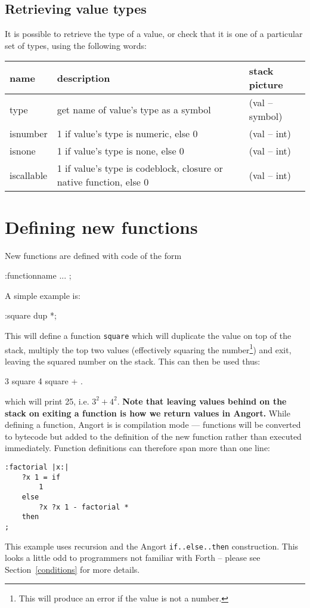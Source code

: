 \subsection{Retrieving value types}
\label{typechecking}
It is possible to retrieve the type of a value, or check that it is
one of a particular set of types, using the following words:
\begin{center}
\begin{tabular}{|l|p{4in}|l|}\hline
\textbf{name} & \textbf{description} & \textbf{stack picture}\\ \hline
type & get name of value's type as a symbol & (val -- symbol)\\
isnumber & 1 if value's type is numeric, else 0 & (val -- int)\\
isnone & 1 if value's type is none, else 0 & (val -- int)\\
iscallable & 1 if value's type is codeblock, closure or native function, else 0 & (val -- int)\\
\hline
\end{tabular}
\end{center}

\clearpage
\section{Defining new functions}
New functions are defined with code of the form
\begin{v}
:functionname ... ;
\end{v}
A simple example is:
\begin{v}
:square dup *;
\end{v}
This will define a function \texttt{square} which will duplicate
the value on top of the stack, multiply the top two values
(effectively squaring the number\footnote{This will produce
an error if the value is not a number.}) and exit, leaving the
squared number on the stack. This can then be used thus:
\begin{v}
3 square 4 square + .
\end{v}
which will print 25, i.e. $3^2+4^2$. \textbf{Note that leaving values behind
on the stack on exiting a function is how we return values in Angort.}
While defining a function, Angort is is compilation mode --- functions will
be converted to bytecode but added to the definition of the new function
rather than executed immediately. Function definitions can therefore span
more than one line:
\begin{lstlisting}
:factorial |x:|
    ?x 1 = if
        1
    else
        ?x ?x 1 - factorial *
    then
;  
\end{lstlisting}
This example uses recursion and the Angort \texttt{if..else..then} construction.
This looks a little odd to programmers not familiar with Forth -- please
see Section~\ref{conditions} for more details.


